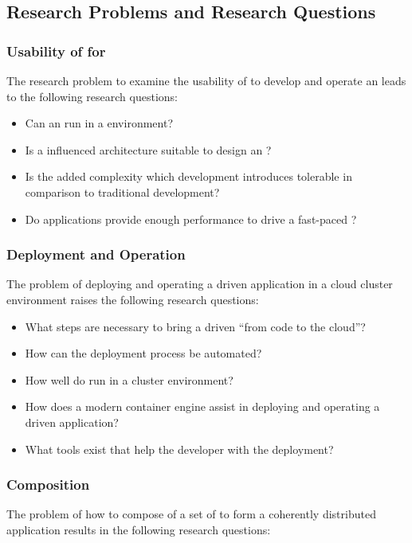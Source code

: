 \subsection{Research Problems and Research Questions}
\label{sub:problems}

\subsubsection{Usability of \mssuc{} for \ogsucuc{}} 

The research problem to examine the usability of \mss{} to develop and operate
an \og{} leads to the following research questions:

\begin{itemize}
  \item Can an \og{} run in a \ms{} environment?
  \item Is a \ms{} influenced architecture suitable to design an \og{}?
  \item Is the added complexity which \ms{} development introduces tolerable
  in comparison to traditional \og{} development?
  \item Do \ms{} applications provide enough performance to drive a fast-paced
  \og{}?
\end{itemize}

\subsubsection{Deployment and Operation}

The problem of deploying and operating a \ms{} driven \og{} application in a cloud
cluster environment raises the following research questions:

\begin{itemize}
  \item What steps are necessary to bring a \ms{} driven \og{} ``from code to
  the cloud''?
  \item How can the deployment process be automated?
  \item How well do \ogs{} run in a cluster environment?
  \item How does a modern container engine assist in deploying and operating a
  \ms{} driven application?
  \item What tools exist that help the developer with the deployment?
\end{itemize}

\subsubsection{\msuc{} Composition}
The problem of how to compose of a set of \mss{} to form a coherently
distributed application results in the following research questions:

